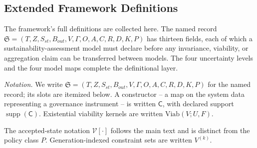 
\subsection{Extended Framework Definitions}

The framework's full definitions are collected here. The named record $\mathfrak{S} = (T, Z, S_{st}, B_{out}, V, \Gamma, O, A, C, R, D, K, P)$ has thirteen fields, each of which a sustainability-assessment model must declare before any invariance, viability, or aggregation claim can be transferred between models. The four uncertainty levels and the four model maps complete the definitional layer.

\emph{Notation.} We write $\mathfrak{S} = (T, Z, S_{st}, B_{out}, V, \Gamma, O, A, C, R, D, K, P)$ for the named record; its slots are itemized below. A constructor -- a map on the system data representing a governance instrument -- is written $\mathsf{C}$, with declared support $\operatorname{supp}(\mathsf{C})$. Existential viability kernels are written $\mathrm{Viab}(V; U, F)$.

The accepted-state notation $\mathcal{V}[\cdot]$ follows the main text and is distinct from the policy class $P$. Generation-indexed constraint sets are written $V^{(k)}$.

